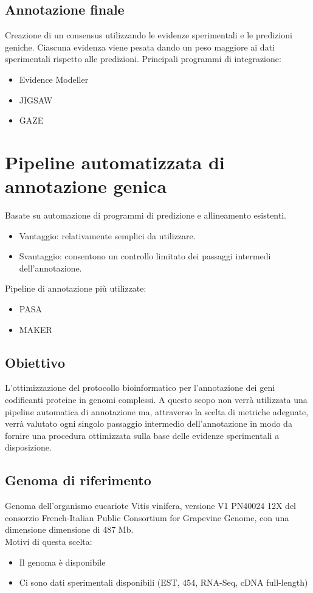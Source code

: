 \documentclass{article}
\begin{document}
\subsection{Annotazione finale}
Creazione di un consensus utilizzando le evidenze sperimentali e le predizioni geniche.
Ciascuna evidenza viene pesata dando un peso maggiore ai
dati sperimentali rispetto alle predizioni.
Principali programmi
di integrazione:
\begin{itemize}
    \item Evidence Modeller
    \item JIGSAW
    \item GAZE
\end{itemize}

\section{Pipeline automatizzata di annotazione genica}
Basate su automazione di programmi di predizione e
allineamento esistenti.
\begin{itemize}
    \item Vantaggio: relativamente semplici da utilizzare.
    \item Svantaggio: consentono un controllo limitato dei passaggi
    intermedi dell’annotazione.
\end{itemize}
Pipeline di annotazione più utilizzate:
\begin{itemize}
    \item PASA 
    \item MAKER 
\end{itemize}
\subsection{Obiettivo}
L’ottimizzazione del protocollo bioinformatico
per l’annotazione dei geni codificanti proteine
in genomi complessi. A questo scopo non verrà utilizzata una
pipeline automatica di annotazione ma,
attraverso la scelta di metriche adeguate,
verrà valutato ogni singolo passaggio
intermedio dell’annotazione in modo da
fornire una procedura ottimizzata sulla base
delle evidenze sperimentali a disposizione.

\subsection{Genoma di riferimento}
Genoma dell’organismo eucariote Vitis
vinifera, versione V1 PN40024 12X del
consorzio French-Italian Public
Consortium for Grapevine Genome, con
una dimensione dimensione di 487 Mb.\\
Motivi di questa scelta:
\begin{itemize}
    \item Il genoma è disponibile
    \item Ci sono dati sperimentali disponibili
    (EST, 454, RNA-Seq, cDNA full-length)
\end{itemize}
\end{document}
